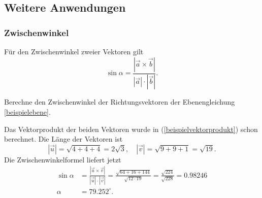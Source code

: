 \subsection{Weitere Anwendungen}

\subsubsection{Zwischenwinkel}
Für den Zwischenwinkel zweier Vektoren gilt
\[
\sin\alpha=\frac{|\vec a\times\vec b|}{|\vec a|\cdot|\vec b|}.
\]
\begin{beispiel}
Berechne den Zwischenwinkel der Richtungsvektoren der Ebenengleichung
\ref{beispielebene}.

\smallskip

{\parindent 0pt Das Vektorprodukt der beiden Vektoren wurde
in (\ref{beispielvektorprodukt}) schon
berechnet.} Die Länge der Vektoren ist
\[
|\vec u|=\sqrt{4+4+4}=2\sqrt{3}
,
\quad
|\vec v|=\sqrt{9+9+1}=\sqrt{19}.
\]
Die Zwischenwinkelformel liefert jetzt
\begin{align*}
\sin\alpha&=\frac{|\vec u\times \vec v|}{|\vec u|\cdot |\vec v|}
=\frac{\sqrt{64+16+144}}{\sqrt{12\cdot 19}}
=\frac{\sqrt{224}}{\sqrt{228}}=0.98246\\
\alpha&=79.252^\circ.
\end{align*}
\end{beispiel}

